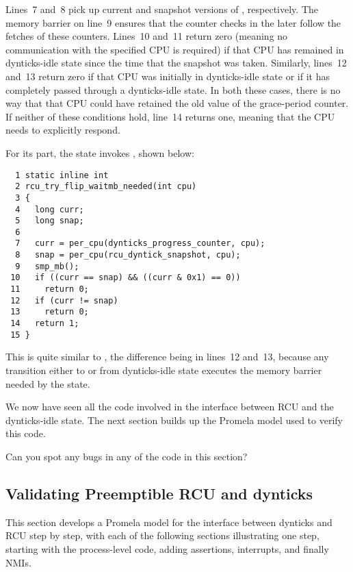 Lines~7 and~8 pick up current and snapshot versions of
, respectively.
The memory barrier on line~9 ensures that the counter checks
in the later  follow
the fetches of these counters.
Lines~10 and~11 return zero (meaning no communication with the
specified CPU is required) if that CPU has remained in dynticks-idle
state since the time that the snapshot was taken.
Similarly, lines~12 and~13 return zero if that CPU was initially
in dynticks-idle state or if it has completely passed through a
dynticks-idle state.
In both these cases, there is no way that that CPU could have retained
the old value of the grace-period counter.
If neither of these conditions hold, line~14 returns one, meaning
that the CPU needs to explicitly respond.

For its part, the  state
invokes , shown below:

{ \scriptsize
\begin{verbatim}
  1 static inline int
  2 rcu_try_flip_waitmb_needed(int cpu)
  3 {
  4   long curr;
  5   long snap;
  6
  7   curr = per_cpu(dynticks_progress_counter, cpu);
  8   snap = per_cpu(rcu_dyntick_snapshot, cpu);
  9   smp_mb();
 10   if ((curr == snap) && ((curr & 0x1) == 0))
 11     return 0;
 12   if (curr != snap)
 13     return 0;
 14   return 1;
 15 }
\end{verbatim}
}

This is quite similar to ,
the difference being in lines~12 and~13, because any transition
either to or from dynticks-idle state executes the memory barrier
needed by the  state.

We now have seen all the code involved in the interface between
RCU and the dynticks-idle state.
The next section builds up the Promela model used to verify this
code.

\QuickQuiz{}
	Can you spot any bugs in any of the code in this section?
 \QuickQuizEnd

\subsection{Validating Preemptible RCU and dynticks}
\label{sec:formal:Validating Preemptible RCU and dynticks}

This section develops a Promela model for the interface between
dynticks and RCU step by step, with each of the following sections
illustrating one step, starting with the process-level code,
adding assertions, interrupts, and finally NMIs.

